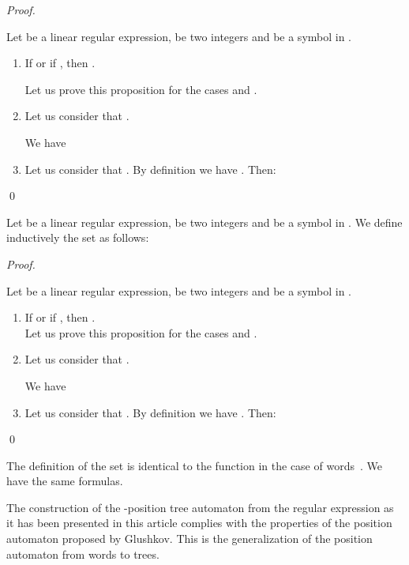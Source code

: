 \documentclass{llncs}
\begin{document}
\begin{proof}
\begin{sloppy}  
  
Let  be a linear regular expression,  be two integers and  be a symbol in .  
\begin{enumerate}
\item If  or if , then .

Let us prove this proposition for the cases  and . 
\item Let us consider that . 

We have 

\item Let us consider that . By definition we have . Then: 
 
\end{enumerate}
\end{sloppy}   
\qed
\end{proof}

\begin{proposition}
\label{x}
Let  be a linear regular expression,  be two integers and  be a symbol in .  
We define inductively the set  as follows:

\end{proposition}
\begin{proof}
\begin{sloppy}  
  
Let  be a linear regular expression,  be two integers and  be a symbol in . 
\begin{enumerate}
\item If  or if , then .\\
Let us prove this proposition for the cases  and . 
\item Let us consider that . 

We have 

\item Let us consider that . By definition we have . Then: 
 
\end{enumerate}
\end{sloppy}    
\qed
\end{proof}
\begin{remark}\label{remark}
The definition of the set  is identical to the function  in the case of words~\cite{ZPC}. We have the same formulas.
\end{remark} 



The construction of the -position tree automaton  from the regular expression  as it has been presented in this article complies with the properties of the position automaton proposed by Glushkov. 
This is the generalization of the position automaton from words to trees.
\end{document}
